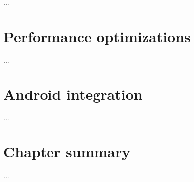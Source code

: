 ...

\section{Performance optimizations} \label{sec:impl:performance}

...

\section{Android integration} \label{sec:impl:android}


...

\section{Chapter summary}

...

